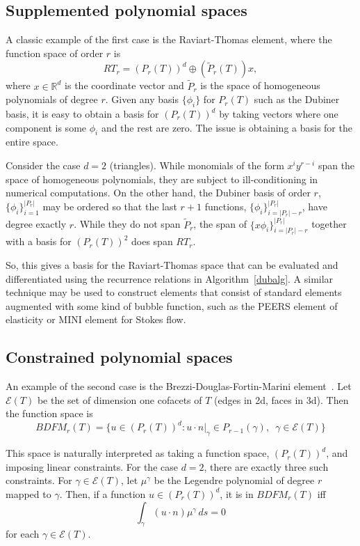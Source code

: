 \subsection{Supplemented polynomial spaces}
A classic example of the first case is the Raviart-Thomas element,
where the function space of order \(r \) is
\[
RT_r = \left( P_r(T) \right)^d \oplus \left( \tilde{P}_r(T) \right) x,
\]
where \( x \in \mathbb{R}^d \) is the coordinate vector and
\( \tilde{P}_r \) is the space of homogeneous polynomials of degree \(
r \).
Given any basis \( \{ \phi_i \} \) for \( P_r(T) \) such as the
Dubiner basis, it is easy to obtain a basis for \( (P_r(T))^d \) by
taking vectors where one component is some \( \phi_i \) and the rest
are zero.  The issue is obtaining a basis for the entire space.

Consider the case \( d = 2 \) (triangles).  While monomials of the
form
\(
x^i y^{r-i}
\) span the space of homogeneous
polynomials, they are subject to ill-conditioning in numerical computations.
On the other hand, the Dubiner basis
of order \( r \), \( \{ \phi_i \}_{i=1}^{|P_r|} \)
may be ordered so that the last \( r + 1 \) functions,
\( \{ \phi_i \}_{i=|P_r|-r}^{|P_r|} \), have degree exactly \( r \).
While they do not span \( \tilde{P}_r \), the span of
\( \{ x \phi_i \}_{i=|P_r|-r}^{|P_r|} \) together with a basis for \(
(P_r(T))^2 \) does span \( RT_r \).

So, this gives a basis for the Raviart-Thomas space that can be
evaluated and differentiated using the recurrence relations in Algorithm~\ref{dubalg}.
A similar technique may be used to construct elements that
consist of standard elements augmented with some kind of bubble
function, such as
the PEERS element of elasticity or MINI element for Stokes flow.


\subsection{Constrained polynomial spaces}
An example of the second case is the Brezzi-Douglas-Fortin-Marini
element~\cite{BreFor91}.  Let \( \mathcal{E}(T) \) be the set of dimension one
cofacets of \( T \) (edges in 2d, faces in 3d).  Then the function
space is
\[
BDFM_r(T) = \{ u \in (P_r(T))^d : u\cdot n|_{\gamma} \in
P_{r-1}(\gamma), \, \, \, \gamma \in \mathcal{E}(T) \}
\]

This space is naturally interpreted as taking a function space,
\( (P_r(T))^d \), and imposing linear constraints.  For the case \( d
= 2 \), there are exactly three such constraints.  For \( \gamma
\in \mathcal{E}(T) \), let \( \mu^\gamma \) be the Legendre polynomial
of degree \( r \) mapped to \( \gamma \).  Then, if a function \( u
\in (P_r(T))^d \), it is in \( BDFM_r(T) \) iff
\[
\int_{\gamma} ( u \cdot n ) \mu^\gamma \, ds = 0
\]
for each \( \gamma \in \mathcal{E}(T) \).

